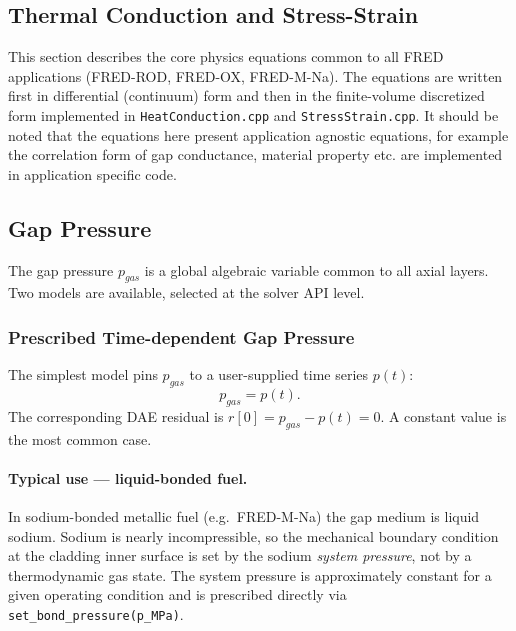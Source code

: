 \begin{refsection}

\section{Thermal Conduction and Stress-Strain}
\label{sec:thermo_mech}

This section describes the core physics equations common to all FRED applications (FRED-ROD, FRED-OX, FRED-M-Na).  The equations are written first in differential (continuum) form and then in the finite-volume discretized form implemented in \texttt{HeatConduction.cpp} and \texttt{StressStrain.cpp}. It should be noted that the equations here present application agnostic equations, for example the correlation form of gap conductance, material property etc. are implemented in application specific code.

\subsection{Gap Pressure}
\label{sec:gap_pressure_rod}

The gap pressure $p_{gas}$ is a global algebraic variable common to all axial layers.  Two models are available, selected at the solver API level.

\subsubsection{Prescribed Time-dependent Gap Pressure}
\label{sec:prescribed_pressure}

The simplest model pins $p_{gas}$ to a user-supplied time series $p(t)$:
\begin{equation}
  p_{gas} = p(t).
  \label{eq:gpres_prescribed}
\end{equation}
The corresponding DAE residual is $r[0] = p_{gas} - p(t) = 0$.  A constant value is the most common case.

\paragraph{Typical use — liquid-bonded fuel.} In sodium-bonded metallic fuel (e.g.\ FRED-M-Na) the gap medium is liquid sodium.  Sodium is nearly incompressible, so the mechanical boundary condition at the cladding inner surface is set by the sodium \emph{system pressure}, not by a thermodynamic gas state.  The system pressure is approximately constant for a given operating condition and is prescribed directly via \texttt{set\_bond\_pressure(p\_MPa)}.


\end{refsection}

